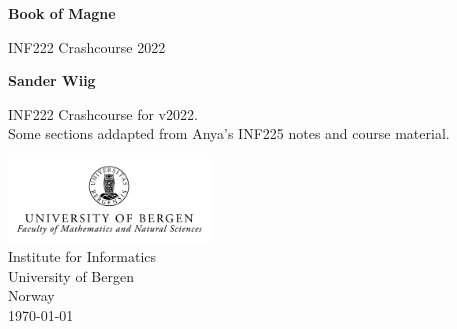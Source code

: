 \documentclass{article}
\begin{document}
    \begin{titlepage}
        \begin{center}
            \vspace*{1cm}
    
            \huge
            \textbf{Book of Magne}
    
            \vspace{0.5cm}
            \LARGE
            INF222 Crashcourse 2022
                
            \vspace{1.5cm}

            \textbf{Sander Wiig}
    
            \vfill
            
            \Large
            INF222 Crashcourse for v2022.\\
            Some sections addapted from Anya's INF225 notes and course material.
                
            \vspace{0.5cm}
        
            \includegraphics[width=0.4\textwidth]{UiBlogoMN_gray_m_Eng.png}\\
            \Large
            Institute for Informatics\\
            University of Bergen\\
            Norway\\
            \today
                
        \end{center}
    \end{titlepage}
    \newpage
    \tableofcontents
    \newpage
\end{document}
